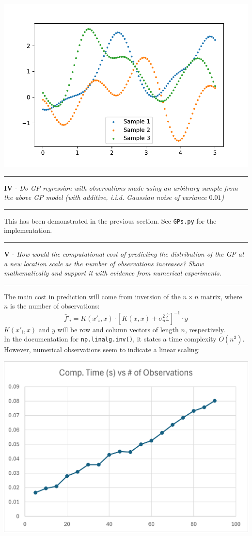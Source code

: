 \documentclass[12pt]{article}
\newcommand{\idop}{\hat{\mathds{1}}}
\begin{document}
    \begin{center}
        \includegraphics{sampling.pdf}
    \end{center}
    \begin{center}
        \hrule\vspace*{0.25cm}
        \textbf{IV} - \textit{Do GP regression with observations made using an arbitrary sample from the above GP model (with additive, i.i.d. Gaussian noise of variance $0.01$)}\vspace*{0.25cm}\hrule
    \end{center}
    This has been demonstrated in the previous section. See \verb|GPs.py| for the implementation.
    \begin{center}
        \hrule\vspace*{0.25cm}
        \textbf{V} - \textit{How would the computational cost of predicting the distribution of the GP at a new location scale as the number of observations increases? Show mathematically and support it with evidence from numerical experiments.}\vspace*{0.25cm}\hrule
    \end{center}
    The main cost in prediction will come from inversion of the $n\times n$ matrix, where $n$ is the number of observations:
    \begin{equation*}
        \bar f'_i = K(x'_i,x) \cdot \left[ K(x,x) + \sigma_n^2\idop\right]^{-1}\cdot y
    \end{equation*}
    $K(x'_i,x)$ and $y$ will be row and column vectors of length $n$, respectively.\\
    In the documentation for \verb|np.linalg.inv()|, it states a time complexity $O(n^3)$. However, numerical observations seem to indicate a linear scaling:
    \begin{center}
        \includegraphics{timescaling.png}
    \end{center}
\end{document}
